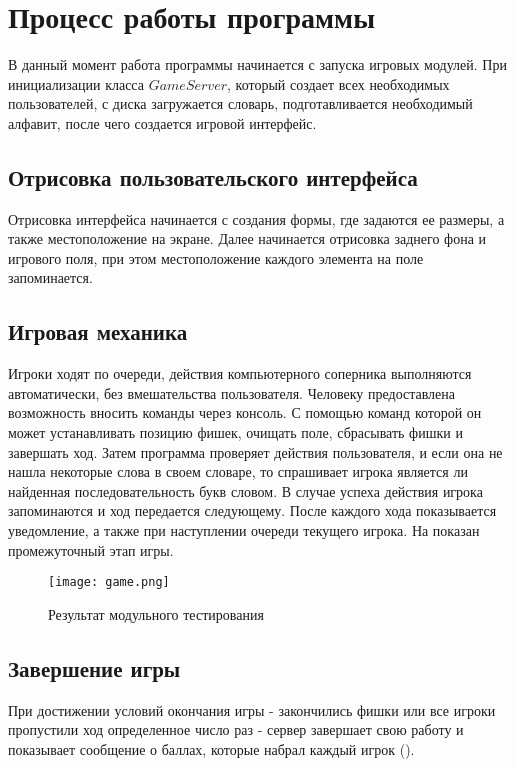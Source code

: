 \documentclass[a4paper,14pt]{article}
\begin{document}
\section{Процесс работы программы}
	В данный момент работа программы начинается с запуска игровых модулей.
	При инициализации класса $GameServer$, который создает всех необходимых пользователей, с диска загружается словарь, подготавливается необходимый алфавит, после чего создается игровой интерфейс.

	\subsection[Отрисовка интерфейса]{Отрисовка пользовательского интерфейса}
	Отрисовка интерфейса начинается с создания формы, где задаются ее размеры, а также местоположение на экране.
	Далее начинается отрисовка заднего фона и игрового поля, при этом местоположение каждого элемента на поле запоминается.
		
	\subsection{Игровая механика}
	Игроки ходят по очереди, действия компьютерного соперника выполняются автоматически, без вмешательства пользователя.
	Человеку предоставлена возможность вносить команды через консоль.
	С помощью команд которой он может устанавливать позицию фишек, очищать поле, сбрасывать фишки и завершать ход.
	Затем программа проверяет действия пользователя, и если она не нашла некоторые слова в своем словаре, то спрашивает игрока является ли найденная последовательность букв словом.
	В случае успеха действия игрока запоминаются и ход передается следующему.
	После каждого хода показывается уведомление, а также при наступлении очереди текущего игрока. На  показан промежуточный этап игры.
	
	\begin{figure}[bhtp]
		\centering
		\texttt{[image: game.png]}
		\caption{Результат модульного тестирования}
		\label{img:game}
	\end{figure}

	\subsection{Завершение игры}
	При достижении условий окончания игры - закончились фишки или все игроки пропустили ход определенное число раз - сервер завершает свою работу и показывает сообщение о баллах, которые набрал каждый игрок ().
	
\end{document}
